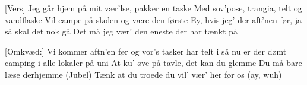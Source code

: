 \documentclass[a4paper,11pt]{article}
\begin{document}
\begin{song}
[Vers] 
Jeg går hjem på mit vær'lse, pakker en taske 
Med sov'pose, trangia, telt og vandflaske 
Vil campe på skolen og være den første  
Ey, hvis jeg' der aft'nen før, ja så skal det nok gå
Det må jeg vær' den eneste der har tænkt på 


[Omkvæd:] 
Vi kommer aftn'en før og vor's tasker har telt i  
så nu er der dømt camping i alle lokaler på uni 
At ku' øve på tavle, det kan du glemme 
Du må bare læse derhjemme 
(Jubel)
Tænk at du troede du vil' vær' her før os (ay, wuh)
\end{song}
\end{document}
